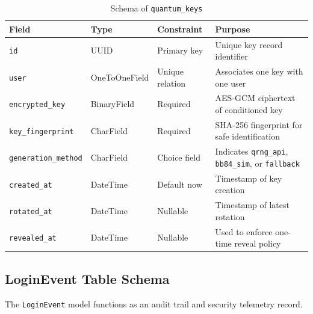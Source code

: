 \begin{table}[H]
\centering
\small
\caption{Schema of \texttt{quantum\_keys}}
\label{tab:quantum-keys}
\begin{tabular}{|p{3.0cm}|p{2.8cm}|p{1.8cm}|p{6.0cm}|}
\hline
\textbf{Field} & \textbf{Type} & \textbf{Constraint} & \textbf{Purpose} \\
\hline
\texttt{id} & UUID & Primary key & Unique key record identifier \\
\hline
\texttt{user} & OneToOneField & Unique relation & Associates one key with one user \\
\hline
\texttt{encrypted\_key} & BinaryField & Required & AES-GCM ciphertext of conditioned key \\
\hline
\texttt{key\_fingerprint} & CharField & Required & SHA-256 fingerprint for safe identification \\
\hline
\texttt{generation\_method} & CharField & Choice field & Indicates \texttt{qrng\_api}, \texttt{bb84\_sim}, or \texttt{fallback} \\
\hline
\texttt{created\_at} & DateTime & Default now & Timestamp of key creation \\
\hline
\texttt{rotated\_at} & DateTime & Nullable & Timestamp of latest rotation \\
\hline
\texttt{revealed\_at} & DateTime & Nullable & Used to enforce one-time reveal policy \\
\hline
\end{tabular}
\end{table}

\subsection{LoginEvent Table Schema}
The \texttt{LoginEvent} model functions as an audit trail and security telemetry record.

